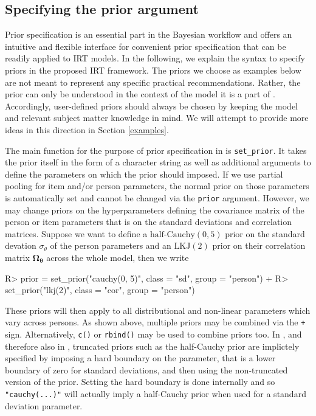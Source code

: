 \documentclass[jss]{jss}
\begin{document}
\hypertarget{brms-prior}{%
\subsection{Specifying the prior argument}\label{brms-prior}}

Prior specification is an essential part in the Bayesian workflow and
 offers an intuitive and flexible interface for convenient
prior specification that can be readily applied to IRT models. In the
following, we explain the syntax to specify priors in the proposed IRT
framework. The priors we choose as examples below are not meant to
represent any specific practical recommendations. Rather, the prior can
only be understood in the context of the model it is a part of
\citep{gelman2017}. Accordingly, user-defined priors should always be
chosen by keeping the model and relevant subject matter knowledge in
mind. We will attempt to provide more ideas in this direction in Section
\ref{examples}.

The main function for the purpose of prior specification in 
is \texttt{set\_prior}. It takes the prior itself in the form of a
character string as well as additional arguments to define the
parameters on which the prior should imposed. If we use partial pooling
for item and/or person parameters, the normal prior on those parameters
is automatically set and cannot be changed via the \texttt{prior}
argument. However, we may change priors on the hyperparameters defining
the covariance matrix of the person or item parameters that is on the
standard deviations and correlation matrices. Suppose we want to define
a \(\text{half-Cauchy}(0, 5)\) prior on the standard devation
\(\sigma_\theta\) of the person parameters and an \(\text{LKJ}(2)\)
prior on their correlation matrix \(\mathbf{\Omega_\theta}\) across the
whole model, then we write

\begin{CodeChunk}

\begin{CodeInput}
R> prior = set_prior("cauchy(0, 5)", class = "sd", group = "person") +
R>   set_prior("lkj(2)", class = "cor", group = "person")
\end{CodeInput}
\end{CodeChunk}

These priors will then apply to all distributional and non-linear
parameters which vary across persons. As shown above, multiple priors
may be combined via the \texttt{+} sign. Alternatively, \texttt{c()} or
\texttt{rbind()} may be used to combine priors too. In ,
and therefore also in , truncated priors such as the
half-Cauchy prior are implictely specified by imposing a hard boundary
on the parameter, that is a lower boundary of zero for standard
deviations, and then using the non-truncated version of the prior.
Setting the hard boundary is done internally and so
\texttt{"cauchy(...)"} will actually imply a half-Cauchy prior when used
for a standard deviation parameter.
\end{document}
